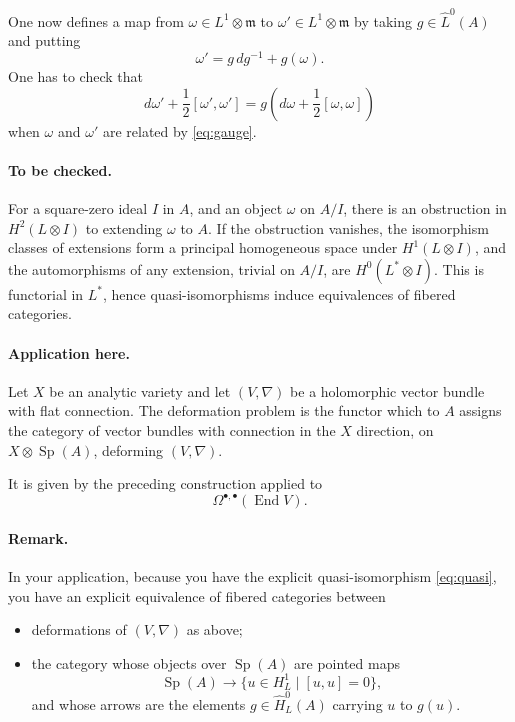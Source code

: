 \documentclass[11pt]{article}
\newcommand{\End}{\operatorname{End}}
\newcommand{\Sp}{\operatorname{Sp}}
\begin{document}
One now defines a map from $\omega\in L^1\otimes\mathfrak m$ to $\omega'\in L^1\otimes\mathfrak m$ by taking $g\in\widehat L^0(A)$ and putting
\begin{equation}\label{eq:gauge}
  \omega'=g\,dg^{-1}+g(\omega).
\end{equation}
One has to check that
\[
  d\omega'+\frac12[\omega',\omega']
  =g\left(d\omega+\frac12[\omega,\omega]\right)
\]
when $\omega$ and $\omega'$ are related by \eqref{eq:gauge}.

\paragraph{To be checked.}
For a square-zero ideal $I$ in $A$, and an object $\omega$ on $A/I$, there is an obstruction in $H^2(L\otimes I)$ to extending $\omega$ to $A$. If the obstruction vanishes, the isomorphism classes of extensions form a principal homogeneous space under $H^1(L\otimes I)$, and the automorphisms of any extension, trivial on $A/I$, are $H^0(L^*\otimes I)$. This is functorial in $L^*$, hence quasi-isomorphisms induce equivalences of fibered categories.

\paragraph{Application here.}
Let $X$ be an analytic variety and let $(V,\nabla)$ be a holomorphic vector bundle with flat connection. The deformation problem is the functor which to $A$ assigns the category of vector bundles with connection in the $X$ direction, on $X\otimes\Sp(A)$, deforming $(V,\nabla)$.

It is given by the preceding construction applied to
\[
  \Omega^{\bullet,\bullet}(\End V).
\]

\paragraph{Remark.}
In your application, because you have the explicit quasi-isomorphism \eqref{eq:quasi}, you have an explicit equivalence of fibered categories between
\begin{itemize}
\item deformations of $(V,\nabla)$ as above;
\item the category whose objects over $\Sp(A)$ are pointed maps
\[
  \Sp(A)\longrightarrow \{u\in H^1_L\mid [u,u]=0\},
\]
and whose arrows are the elements $g\in \widehat{H}^0_L(A)$ carrying $u$ to $g(u)$.
\end{itemize}
\end{document}
